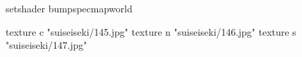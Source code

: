 setshader bumpspecmapworld

    texture c "suiseiseki/145.jpg"
    texture n "suiseiseki/146.jpg"
    texture s "suiseiseki/147.jpg"

